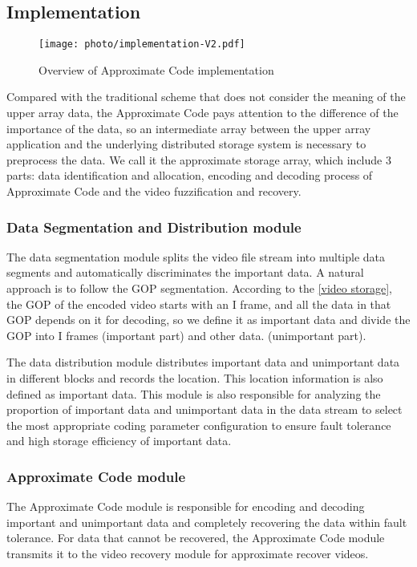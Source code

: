 \documentclass[sigconf]{acmart}
\begin{document}
\subsection{Implementation}\label{Implementation}
\begin{figure}[htb]
\centering
\texttt{[image: photo/implementation-V2.pdf]}
\caption{Overview of Approximate Code implementation}
\label{fig-implementation}
\end{figure}

Compared with the traditional scheme that does not consider the meaning of the upper array data, the Approximate Code pays attention to the difference of the importance of the data, so an intermediate array between the upper array application and the underlying distributed storage system is necessary to preprocess the data. We call it the approximate storage array, which include 3 parts: data identification and allocation, encoding and decoding process of Approximate Code and the video fuzzification and recovery.

\subsubsection{Data Segmentation and Distribution module}
The data segmentation module splits the video file stream into multiple data segments and automatically discriminates the important data. A natural approach is to follow the GOP segmentation. According to the \ref{video storage}, the GOP of the encoded video starts with an I frame, and all the data in that GOP depends on it for decoding, so we define it as important data and divide the GOP into I frames (important part) and other data. (unimportant part).

The data distribution module distributes important data and unimportant data in different blocks and records the location. This location information is also defined as important data. This module is also responsible for analyzing the proportion of important data and unimportant data in the data stream to select the most appropriate coding parameter configuration to ensure fault tolerance and high storage efficiency of important data.

\subsubsection{Approximate Code module}
The Approximate Code module is responsible for encoding and decoding important and unimportant data and completely recovering the data within fault tolerance. For data that cannot be recovered, the Approximate Code module transmits it to the video recovery module for approximate recover videos.
\end{document}
